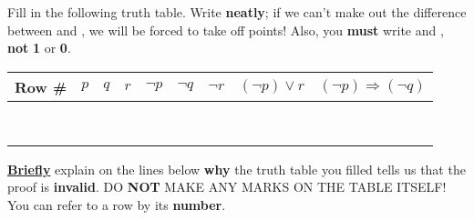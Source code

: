 \documentclass[letterpaper,12pt]{article}
\begin{document}
{{\large Fill in the following truth table. Write {\bf neatly}; if we can't make out the difference between \T{} and \F{}, we will be forced to take off points! Also, you {\bf must} write \T{} and \F{}, {\bf not} \textbf{1} or \textbf{0}. }

\newcommand{\currInd}{\stepcounter{ttableRows}\arabic{ttableRows}}

\begin{center}
	\begin{table}[H] 
		\centering
		\Large 
		\setlength{\tabcolsep}{12pt}
		\begin{tabular}{|c|c|c|c|c|c|c|c|c|} \hline 
			{\bf Row \# } & $p$ & $q$ & $r$ & $\neg p$ & $\neg{q}$ & $\neg  r$ & $ (\neg  p) \lor r$ & $(\neg  p) \Rightarrow (\neg  q)$ \\ \hline
			\currInd & \F & \F & \F & & &  & & \\ \hline 		
			\currInd & \F & \F & \T & & &  & &\\ \hline 		
			\currInd & \F & \T & \F & & &   & &\\ \hline 		
			\currInd & \F & \T & \T & & & & &\\ \hline
			\currInd & \T & \F & \F & & & & &\\ \hline 		
			\currInd & \T & \F & \T & & & & &\\ \hline
			\currInd & \T & \T & \F & & & & &\\ \hline 		
			\currInd & \T & \T & \T & & & & &\\ \hline												
		\end{tabular}
	\end{table}
\end{center} \vspace{-.3in} 



\vspace{-.3in}

{\large \underline{\bf Briefly} explain on the lines below \textbf{why} the truth table you filled tells us that the proof is {\bf invalid}. DO {\bf NOT} MAKE ANY MARKS ON THE TABLE ITSELF! You can refer to a row by its \textbf{number}.

\begin{center}
	\hrulefill  \\ \ \\ 
	\hrulefill
\end{center}

\pagebreak

}}
\end{document}

